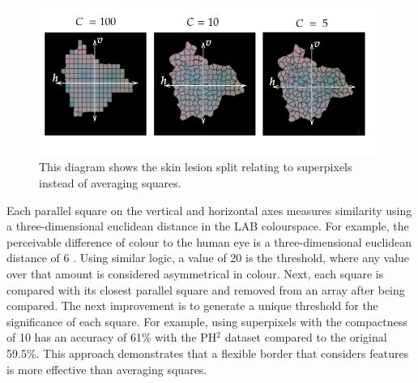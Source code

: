 \documentclass[10.5pt]{report}
\begin{document}
\begin{figure} 
\centering
\includegraphics[scale=0.6]{superpixels.png}
\caption{This diagram shows the skin lesion split relating to superpixels instead of averaging squares.}
\end{figure} \label{SP}

Each parallel square on the vertical and horizontal axes measures similarity using a three-dimensional euclidean distance in the LAB colourspace. For example, the perceivable difference of colour to the human eye is a three-dimensional euclidean distance of 6 \cite{Myridis2014a}. Using similar logic, a value of 20 is the threshold, where any value over that amount is considered asymmetrical in colour. Next, each square is compared with its closest parallel square and removed from an array after being compared. The next improvement is to generate a unique threshold for the significance of each square. For example, using superpixels with the compactness of 10 has an accuracy of 61\% with the PH$^2$ dataset compared to the original 59.5\%. This approach demonstrates that a flexible border that considers features is more effective than averaging squares.
\end{document}
